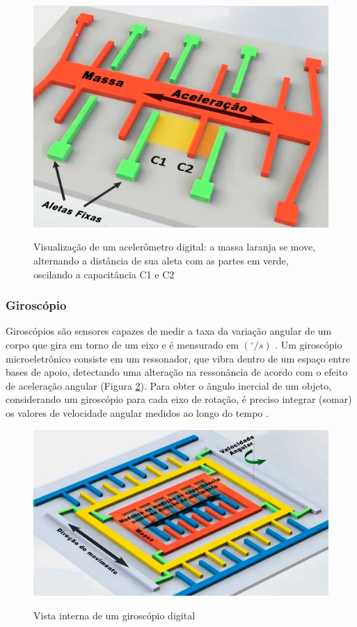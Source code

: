 \begin{figure}[!htb]
	\centering
	\caption{Visualização de um acelerômetro digital: a massa laranja se move, alternando a distância de sua aleta com as partes em verde, oscilando a capacitância C1 e C2}
	\includegraphics[width=0.7\linewidth]{figuras/revisaobiblio/memnsacelerometer}
	\label{fig:memnsacelerometer}
\end{figure}

\subsubsection{Giroscópio}

Giroscópios são sensores capazes de medir a taxa da variação angular de um corpo que gira em torno de um eixo e é mensurado em $ (^{\circ}/s) $ \cite{diss:FabioAUV}. Um giroscópio microeletrônico consiste em um ressonador, que vibra dentro de um espaço entre bases de apoio, detectando uma alteração na ressonância de acordo com o efeito de aceleração angular (Figura \ref{fig:memnsgyro}). Para obter o ângulo inercial de um objeto, considerando um giroscópio para cada eixo de rotação, é preciso integrar (somar) os valores de velocidade angular medidos ao longo do tempo \cite{tcc:viniciusPID2Graus}.


\begin{figure}[!htb]
	\centering
	\caption{Vista interna de um giroscópio digital}
	\includegraphics[width=0.7\linewidth]{figuras/revisaobiblio/memnsgyro}
	\label{fig:memnsgyro}
\end{figure}


